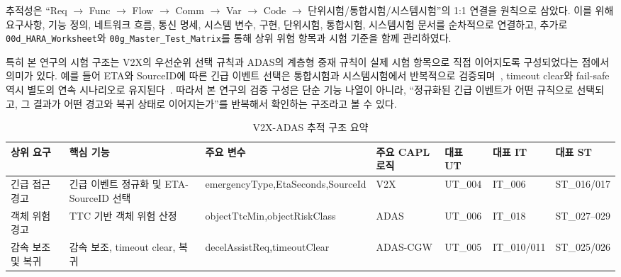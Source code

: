 \documentclass[11pt,a4paper]{article}
\begin{document}
추적성은 ``Req $\rightarrow$ Func $\rightarrow$ Flow $\rightarrow$ Comm $\rightarrow$ Var $\rightarrow$ Code $\rightarrow$ 단위시험/통합시험/시스템시험''의 1:1 연결을 원칙으로 삼았다. 이를 위해 요구사항, 기능 정의, 네트워크 흐름, 통신 명세, 시스템 변수, 구현, 단위시험, 통합시험, 시스템시험 문서를 순차적으로 연결하고, 추가로 \texttt{00d\_HARA\_Worksheet}와 \texttt{00g\_Master\_Test\_Matrix}를 통해 상위 위험 항목과 시험 기준을 함께 관리하였다.

특히 본 연구의 시험 구조는 V2X의 우선순위 선택 규칙과 ADAS의 계층형 중재 규칙이 실제 시험 항목으로 직접 이어지도록 구성되었다는 점에서 의미가 있다. 예를 들어 ETA와 SourceID에 따른 긴급 이벤트 선택은 통합시험과 시스템시험에서 반복적으로 검증되며~\cite{integration_test,system_test}, timeout clear와 fail-safe 역시 별도의 연속 시나리오로 유지된다~\cite{integration_test,master_test_matrix,system_test}. 따라서 본 연구의 검증 구성은 단순 기능 나열이 아니라, ``정규화된 긴급 이벤트가 어떤 규칙으로 선택되고, 그 결과가 어떤 경고와 복귀 상태로 이어지는가''를 반복해서 확인하는 구조라고 볼 수 있다.

\begin{table}[t]
\caption{V2X-ADAS 추적 구조 요약}
\label{tab:traceability}
\centering
\footnotesize
\setlength{\tabcolsep}{4pt}
\begin{tabularx}{\linewidth}{>{\raggedright\arraybackslash}p{2.0cm} >{\raggedright\arraybackslash}p{2.5cm} >{\raggedright\arraybackslash}p{3.0cm} >{\raggedright\arraybackslash}p{1.8cm} >{\raggedright\arraybackslash}p{1.5cm} >{\raggedright\arraybackslash}p{1.5cm} >{\raggedright\arraybackslash}X}
\toprule
상위 요구 & 핵심 기능 & 주요 변수 & 주요 CAPL 로직 & 대표 UT & 대표 IT & 대표 ST \\
\midrule
긴급 접근 경고 & 긴급 이벤트 정규화 및 ETA-SourceID 선택 & emergencyType,\newline EtaSeconds,\newline SourceId & V2X & UT\_004 & IT\_006 & ST\_016/017 \\
객체 위험 경고 & TTC 기반 객체 위험 산정 & objectTtcMin,\newline objectRiskClass & ADAS & UT\_006 & IT\_018 & ST\_027--029 \\
감속 보조 및 복귀 & 감속 보조, timeout clear, 복귀 & decelAssistReq,\newline timeoutClear & ADAS-CGW & UT\_005 & IT\_010/011 & ST\_025/026 \\
\bottomrule
\end{tabularx}
\end{table}
\end{document}
